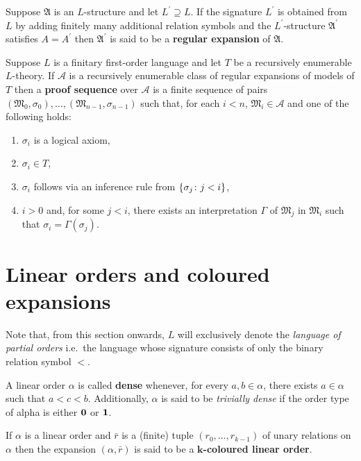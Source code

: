 \begin{dfn}
	Suppose $\mathfrak{A}$ is an $L$-structure and let $L^\prime\supseteq L$.  If the signature $L^\prime$ is obtained from $L$ by adding finitely many additional relation symbols and the $L^\prime$-structure $\mathfrak{A}^\prime$ satisfies $A=A^\prime$ then $\mathfrak{A}^\prime$ is said to be a \textbf{regular expansion} of $\mathfrak{A}$.
\end{dfn}

\begin{dfn}
	Suppose $L$ is a finitary first-order language and let $T$ be a recursively enumerable $L$-theory.  If $\mathcal{A}$ is a recursively enumerable class of regular expansions of models of $T$ then a \textbf{proof sequence} over $\mathcal{A}$ is a finite sequence of pairs $(\mathfrak{M}_0,\sigma_0),\dotsc,(\mathfrak{M}_{n-1},\sigma_{n-1})$ such that, for each $i<n$, $\mathfrak{M}_i\in\mathcal{A}$ and one of the following holds:
	\begin{enumerate}
		\item	$\sigma_i$ is a logical axiom,
		\item	$\sigma_i\in T$,
		\item	$\sigma_i$ follows via an inference rule from $\left\lbrace \sigma_j\colon j<i \right\rbrace$,
		\item	$i>0$ and, for some $j<i$, there exists an interpretation $\Gamma$ of $\mathfrak{M}_j$ in $\mathfrak{M}_i$ such that $\sigma_i=\Gamma(\sigma_j)$.
	\end{enumerate}
\end{dfn}


\section{Linear orders and coloured expansions}

Note that, from this section onwards, $L$ will exclusively denote the \textit{language of partial orders} i.e.\ the language whose signature consists of only the binary relation symbol $<$.


\begin{dfn}
	A linear order $\alpha$ is called \textbf{dense} whenever, for every $a,b\in\alpha$, there exists $a\in\alpha$ such that $a<c<b$.  Additionally, $\alpha$ is said to be \textit{trivially dense} if the order type of alpha is either $\mathbf{0}$ or $\mathbf{1}$.
\end{dfn}

\begin{dfn}
	If $\alpha$ is a linear order and $\bar{r}$ is a (finite) tuple $(r_0,\dotsc,r_{k-1})$ of unary relations on $\alpha$ then the expansion $(\alpha,\bar{r})$ is said to be a $\mathbf{k}$\textbf{-coloured linear order}.
\end{dfn}

